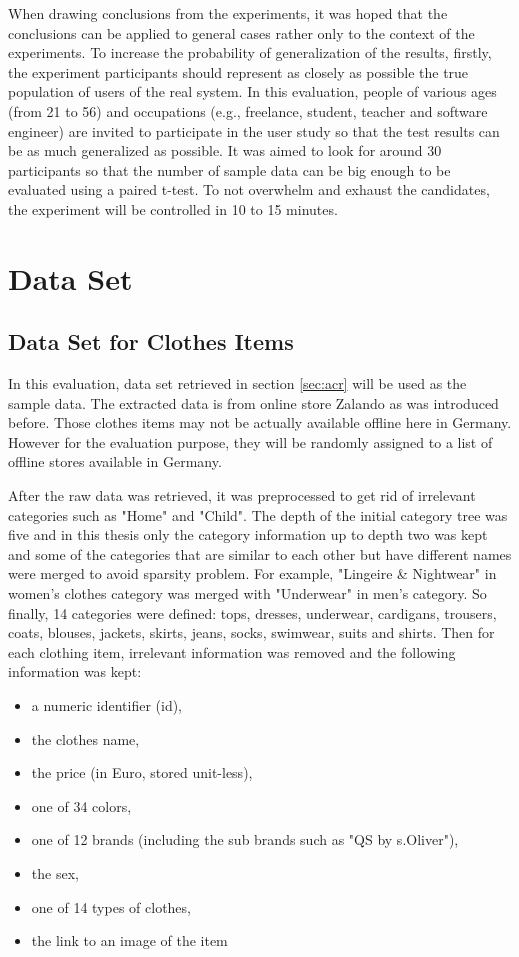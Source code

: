 When drawing conclusions from the experiments, it was hoped that the conclusions can be applied to general cases rather only to the context of the experiments. To increase the probability of generalization of the results, firstly, the experiment participants should represent as closely as possible the true population of users of the real system. In this evaluation, people of various ages (from 21 to 56) and occupations (e.g., freelance, student, teacher and software engineer) are invited to participate in the user study so that the test results can be as much generalized as possible. It was aimed to look for around 30 participants so that the number of sample data can be big enough to be evaluated using a paired t-test. To not overwhelm and exhaust the candidates, the experiment will be controlled in 10 to 15 minutes.

\section{Data Set} \label{sec:ds}

\subsection{Data Set for Clothes Items} \label{sec:ds_ci}

In this evaluation, data set retrieved in section \ref{sec:acr} will be used as the sample data. The extracted data is from online store Zalando as was introduced before. Those clothes items may not be actually available offline here in Germany. However for the evaluation purpose, they will be randomly assigned to a list of offline stores available in Germany. 

After the raw data was retrieved, it was preprocessed to get rid of irrelevant categories such as "Home" and "Child". The depth of the initial category tree was five and in this thesis only the category information up to depth two was kept and some of the categories that are similar to each other but have different names were merged to avoid sparsity problem. For example, "Lingeire \& Nightwear" in women's clothes category was merged with "Underwear" in men's category. So finally, 14 categories were defined: tops, dresses, underwear, cardigans, trousers, coats, blouses, jackets, skirts, jeans, socks, swimwear, suits and shirts. Then for each clothing item, irrelevant information was removed and the following information was kept:
\begin{itemize}
	\item{a numeric identifier (id),}
	\item{the clothes name,}
	\item{the price (in Euro, stored unit-less),}
	\item{one of 34 colors,}
	\item{one of 12 brands (including the sub brands such as "QS by s.Oliver"),}
	\item{the sex,}
	\item{one of 14 types of clothes,}
	\item{the link to an image of the item}
\end{itemize}

